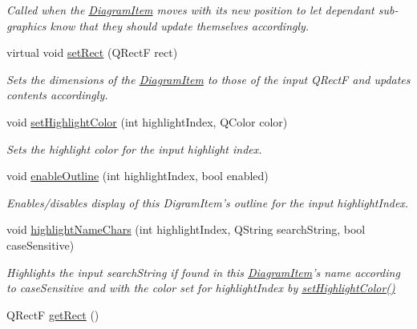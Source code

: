 \begin{DoxyCompactItemize}
\begin{DoxyCompactList}\small\item\em Called when the \hyperlink{class_diagram_item}{Diagram\-Item} moves with its new position to let dependant sub-\/graphics know that they should update themselves accordingly. \end{DoxyCompactList}\item 
\hypertarget{class_diagram_item_aa762f22a017cf64276c3a35835290626}{virtual void \hyperlink{class_diagram_item_aa762f22a017cf64276c3a35835290626}{set\-Rect} (Q\-Rect\-F rect)}\label{class_diagram_item_aa762f22a017cf64276c3a35835290626}

\begin{DoxyCompactList}\small\item\em Sets the dimensions of the \hyperlink{class_diagram_item}{Diagram\-Item} to those of the input Q\-Rect\-F and updates contents accordingly. \end{DoxyCompactList}\item 
void \hyperlink{class_diagram_item_acd47e75b708666c020c48d146c1b20fb}{set\-Highlight\-Color} (int highlight\-Index, Q\-Color color)
\begin{DoxyCompactList}\small\item\em Sets the highlight color for the input highlight index. \end{DoxyCompactList}\item 
void \hyperlink{class_diagram_item_a4d38caef088a06720ddb118f8e700b82}{enable\-Outline} (int highlight\-Index, bool enabled)
\begin{DoxyCompactList}\small\item\em Enables/disables display of this Digram\-Item's outline for the input highlight\-Index. \end{DoxyCompactList}\item 
\hypertarget{class_diagram_item_a6253ca849602d6f7487f2a33851f2fcc}{void \hyperlink{class_diagram_item_a6253ca849602d6f7487f2a33851f2fcc}{highlight\-Name\-Chars} (int highlight\-Index, Q\-String search\-String, bool case\-Sensitive)}\label{class_diagram_item_a6253ca849602d6f7487f2a33851f2fcc}

\begin{DoxyCompactList}\small\item\em Highlights the input search\-String if found in this \hyperlink{class_diagram_item}{Diagram\-Item}'s name according to case\-Sensitive and with the color set for highlight\-Index by \hyperlink{class_diagram_item_acd47e75b708666c020c48d146c1b20fb}{set\-Highlight\-Color()} \end{DoxyCompactList}\item 
\hypertarget{class_diagram_item_a6af79d17111d5a579a5d42002712411f}{Q\-Rect\-F \hyperlink{class_diagram_item_a6af79d17111d5a579a5d42002712411f}{get\-Rect} ()}\label{class_diagram_item_a6af79d17111d5a579a5d42002712411f}


\end{DoxyCompactItemize}

